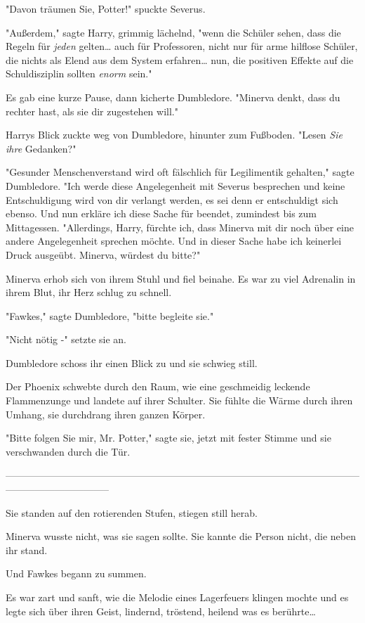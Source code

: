 {"Davon träumen Sie, Potter!" spuckte Severus.

"Außerdem," sagte Harry, grimmig lächelnd, "wenn die Schüler sehen, dass die Regeln für \emph{jeden} gelten… auch für Professoren, nicht nur für arme hilflose Schüler, die nichts als Elend aus dem System erfahren… nun, die positiven Effekte auf die Schuldisziplin sollten \emph{enorm} sein."

Es gab eine kurze Pause, dann kicherte Dumbledore. "Minerva denkt, dass du rechter hast, als sie dir zugestehen will."

Harrys Blick zuckte weg von Dumbledore, hinunter zum Fußboden. "Lesen \emph{Sie ihre} Gedanken?"

"Gesunder Menschenverstand wird oft fälschlich für Legilimentik gehalten," sagte Dumbledore. "Ich werde diese Angelegenheit mit Severus besprechen und keine Entschuldigung wird von dir verlangt werden, es sei denn er entschuldigt sich ebenso. Und nun erkläre ich diese Sache für beendet, zumindest bis zum Mittagessen. "Allerdings, Harry, fürchte ich, dass Minerva mit dir noch über eine andere Angelegenheit sprechen möchte. Und in dieser Sache habe ich keinerlei Druck ausgeübt. Minerva, würdest du bitte?"

Minerva erhob sich von ihrem Stuhl und fiel beinahe. Es war zu viel Adrenalin in ihrem Blut, ihr Herz schlug zu schnell.

"Fawkes," sagte Dumbledore, "bitte begleite sie."

"Nicht nötig -" setzte sie an.

Dumbledore schoss ihr einen Blick zu und sie schwieg still.

Der Phoenix schwebte durch den Raum, wie eine geschmeidig leckende Flammenzunge und landete auf ihrer Schulter. Sie fühlte die Wärme durch ihren Umhang, sie durchdrang ihren ganzen Körper.

"Bitte folgen Sie mir, Mr. Potter," sagte sie, jetzt mit fester Stimme und sie verschwanden durch die Tür.

--------------------------------------------------------------------------------------------------------------------------------------------

Sie standen auf den rotierenden Stufen, stiegen still herab.

Minerva wusste nicht, was sie sagen sollte. Sie kannte die Person nicht, die neben ihr stand.

Und Fawkes begann zu summen.

Es war zart und sanft, wie die Melodie eines Lagerfeuers klingen mochte und es legte sich über ihren Geist, lindernd, tröstend, heilend was es berührte…

}
